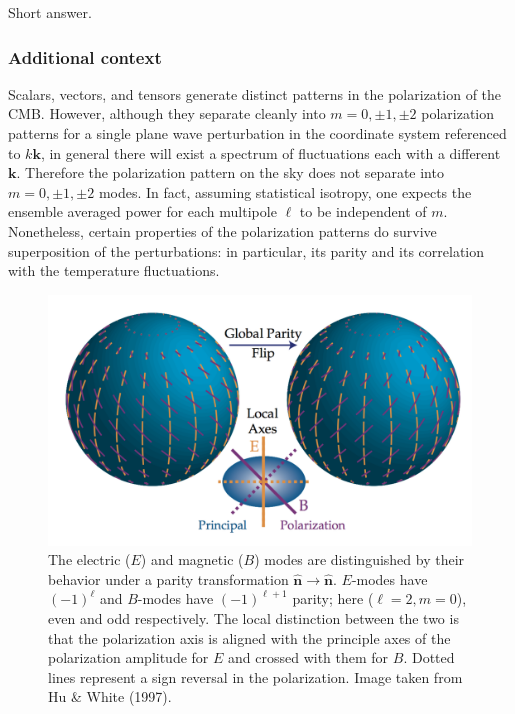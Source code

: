\documentclass[a4paper,11pt]{article}
\begin{document}
Short answer.

\subsubsection{Additional context}

{\noindent}Scalars, vectors, and tensors generate distinct patterns in the polarization of the CMB. However, although they separate cleanly into $m=0,\pm1,\pm2$ polarization patterns for a single plane wave perturbation in the coordinate system referenced to $k\bm{k}$, in general there will exist a spectrum of fluctuations each with a different $\bm{k}$. Therefore the polarization pattern on the sky does not separate into $m=0,\pm1,\pm2$ modes. In fact, assuming statistical isotropy, one expects the ensemble averaged power for each multipole $\ell$ to be independent of $m$. Nonetheless, certain properties of the polarization patterns do survive superposition of the perturbations: in particular, its parity and its correlation with the temperature fluctuations.

\begin{figure}[h]
    \includegraphics[width=16cm]{figures/EBmodes.png}
    \centering
    \caption{\footnotesize{The electric ($E$) and magnetic ($B$) modes are distinguished by their behavior under a parity transformation $\bm{\hat{n}}\rightarrow\bm{\hat{n}}$. $E$-modes have $(-1)^\ell$ and $B$-modes have $(-1)^{\ell+1}$ parity; here ($\ell=2,m=0$), even and odd respectively. The local distinction between the two is that the polarization axis is aligned with the principle axes of the polarization amplitude for $E$ and crossed with them for $B$. Dotted lines represent a sign reversal in the polarization. Image taken from Hu \& White (1997).}}
    \label{fig:ebmodes}
\end{figure}
\end{document}
